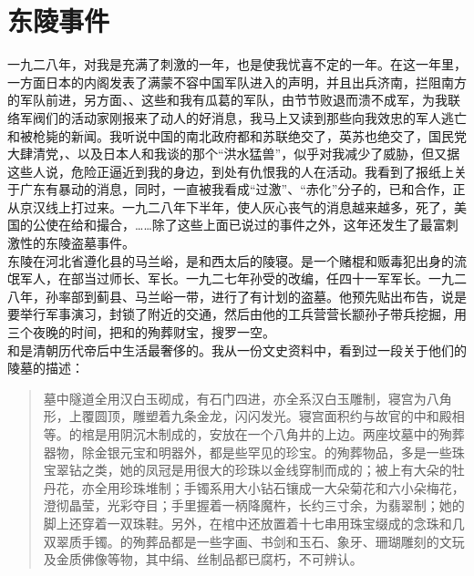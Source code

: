 \fancyhead[RO]{} %
\fancyhead[LE]{} %
\chapter*{东陵事件}
\thispagestyle{empty}
一九二八年，对我是充满了刺激的一年，也是使我忧喜不定的一年。在这一年里，一方面日本的内阁发表了满蒙不容中国军队进入的声明，并且出兵济南，拦阻南方的军队前进，另方面、、这些和我有瓜葛的军队，由节节败退而溃不成军，为我联络军阀们的活动家刚报来了动人的好消息，我马上又读到那些向我效忠的军人逃亡和被枪毙的新闻。我听说中国的南北政府都和苏联绝交了，英苏也绝交了，国民党大肆清党，、以及日本人和我谈的那个“洪水猛兽”，似乎对我减少了威胁，但又据这些人说，危险正逼近到我的身边，到处有仇恨我的人在活动。我看到了报纸上关于广东有暴动的消息，同时，一直被我看成“过激”、“赤化”分子的，已和合作，正从京汉线上打过来。一九二八年下半年，使人灰心丧气的消息越来越多，死了，美国的公使在给和撮合，……除了这些上面已说过的事件之外，这年还发生了最富刺激性的东陵盗墓事件。\\

东陵在河北省遵化县的马兰峪，是和西太后的陵寝。是一个赌棍和贩毒犯出身的流氓军人，在部当过师长、军长。一九二七年孙受的改编，任四十一军军长。一九二八年，孙率部到蓟县、马兰峪一带，进行了有计划的盗墓。他预先贴出布告，说是要举行军事演习，封锁了附近的交通，然后由他的工兵营营长颛孙子带兵挖掘，用三个夜晚的时间，把和的殉葬财宝，搜罗一空。\\

和是清朝历代帝后中生活最奢侈的。我从一份文史资料中，看到过一段关于他们的陵墓的描述：\\

\begin{quote}
	墓中隧道全用汉白玉砌成，有石门四进，亦全系汉白玉雕制，寝宫为八角形，上覆圆顶，雕塑着九条金龙，闪闪发光。寝宫面积约与故官的中和殿相等。的棺是用阴沉木制成的，安放在一个八角井的上边。两座坟墓中的殉葬器物，除金银元宝和明器外，都是些罕见的珍宝。的殉葬物品，多是一些珠宝翠钻之类，她的凤冠是用很大的珍珠以金线穿制而成的；被上有大朵的牡丹花，亦全用珍珠堆制；手镯系用大小钻石镶成一大朵菊花和六小朵梅花，澄彻晶莹，光彩夺目；手里握着一柄降魔杵，长约三寸余，为翡翠制；她的脚上还穿着一双珠鞋。另外，在棺中还放置着十七串用珠宝缀成的念珠和几双翠质手镯。的殉葬品都是一些字画、书剑和玉石、象牙、珊瑚雕刻的文玩及金质佛像等物，其中绢、丝制品都已腐朽，不可辨认。\\
\end{quote}

